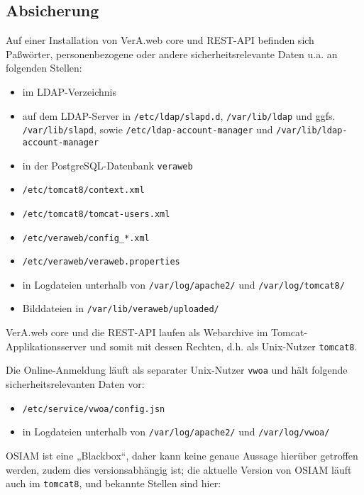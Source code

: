 \subsection{Absicherung}\label{subsec:links-sec}

Auf einer Installation von VerA.web core und REST-API befinden sich
Paßwörter, personenbezogene oder andere sicherheitsrelevante Daten
u.a. an folgenden Stellen:\keinumbruch

\begin{itemize}
 \item{im LDAP-Verzeichnis}
 \item{auf dem LDAP-Server in \texttt{/etc/ldap/slapd.d},
  \texttt{/var/lib/ldap} und ggfs. \texttt{/var/lib/slapd},
  sowie \texttt{/etc/ldap-account-manager} und
  \texttt{/var/lib/ldap-account-manager}}
 \item{in der PostgreSQL-Datenbank \texttt{veraweb}}
 \item{\texttt{/etc/tomcat8/context.xml}}
 \item{\texttt{/etc/tomcat8/tomcat-users.xml}}
 \item{\texttt{/etc/veraweb/config\_*.xml}}
 \item{\texttt{/etc/veraweb/veraweb.properties}}
 \item{in Logdateien unterhalb von \texttt{/var/log/apache2/}
  und \texttt{/var/log/tomcat8/}}
 \item{Bilddateien in \texttt{/var/lib/veraweb/uploaded/}}
\end{itemize}

VerA.web core und die REST-API laufen als Webarchive im
Tomcat-Applikationsserver und somit mit dessen Rechten,
d.h. als Unix-Nutzer \texttt{tomcat8}.

\ifoa

Die Online-Anmeldung läuft als separater Unix-Nutzer \texttt{vwoa}
und hält folgende sicherheitsrelevanten Daten vor:\keinumbruch

\begin{itemize}
 \item{\texttt{/etc/service/vwoa/config.jsn}}
 \item{in Logdateien unterhalb von \texttt{/var/log/apache2/}
  und \texttt{/var/log/vwoa/}}
\end{itemize}

OSIAM ist eine „Blackbox“, daher kann keine genaue Aussage hierüber getroffen
werden, zudem dies versionsabhängig ist; die aktuelle Version von OSIAM läuft
auch im \texttt{tomcat8}, und bekannte Stellen sind hier:\keinumbruch

